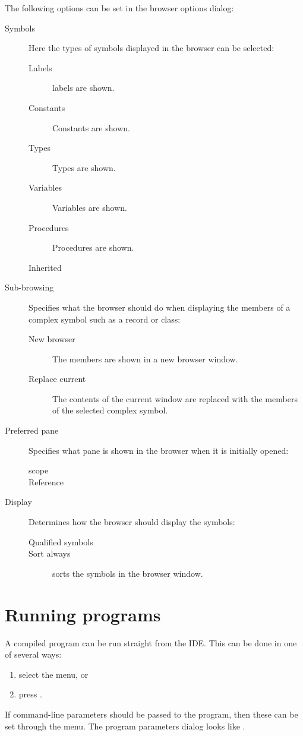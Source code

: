 The following options can be set in the browser options dialog:
\begin{description}
\item[Symbols] Here the types of symbols displayed in the browser can be
selected:
\begin{description}
\item[Labels] labels are shown.
\item[Constants] Constants are shown.
\item[Types] Types are shown.
\item[Variables] Variables are shown.
\item[Procedures] Procedures are shown.
\item[Inherited]
\end{description}
\item[Sub-browsing] Specifies what the browser should do when displaying the
members of a complex symbol such as a record or class:
\begin{description}
\item[New browser] The members are shown in a new browser window.
\item[Replace current] The contents of the current window are replaced with
the members of the selected complex symbol.
\end{description}
\item[Preferred pane] Specifies what pane is shown in the browser when it is
initially opened:
\begin{description}
\item[scope]
\item[Reference]
\end{description}
\item[Display] Determines how the browser should display the symbols:
\begin{description}
\item[Qualified symbols]
\item[Sort always] sorts the symbols in the browser window. 
\end{description}
\end{description}

\section{Running programs}
\label{se:running}
A compiled program can be run straight from the IDE. This can be done
in one of several ways:
\begin{enumerate}
\item select the  menu, or
\item press .
\end{enumerate}
If command-line parameters should be passed to the program, then these
can be set through the  menu. 
The program parameters dialog looks like .

